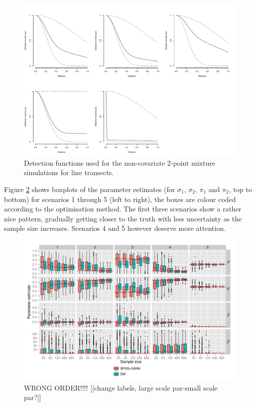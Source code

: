 \begin{figure}
\centering
\includegraphics[width=6in]{mix/figs/nocovsims.pdf}
\caption{Detection functions used for the non-covariate 2-point mixture simulations for line transects.}
\label{mmds-nocov-funcs}
\end{figure}

Figure \ref{mmds-nocov-boxplots} shows boxplots of the parameter estimates (for $\sigma_1$, $\sigma_2$, $\pi_1$ and $\pi_2$, top to bottom) for scenarios 1 through 5 (left to right), the boxes are colour coded according to the optimisation method. The first three scenarios show a rather nice pattern, gradually getting closer to the truth with less uncertainty as the sample size increases. Scenarios 4 and 5 however deserve more attention.

\begin{figure}
\centering
\includegraphics[width=6in]{mix/figs/nocov-boxplots.pdf}
\caption{WRONG ORDER!!!! [[change labels, large scale par-small scale par?]]}
\label{mmds-nocov-boxplots}
\end{figure}

